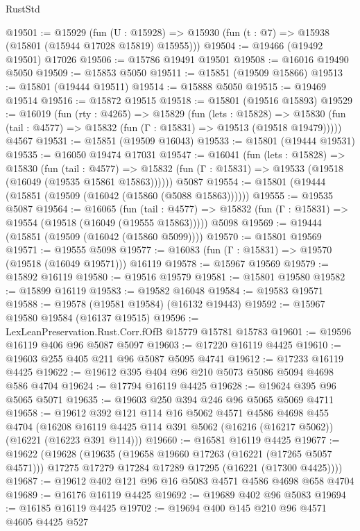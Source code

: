 \begin{lexlean}{RustStd}
\begin{coremodule}
@19501 := @15929
    (fun (U : @15928) => @15930 (fun (t : @7) => @15938 (@15801 (@15944 @17028 @15819) @15955)))
@19504 := @19466 (@19492 @19501) @17026
@19506 := @15786 @19491 @19501
@19508 := @16016 @19490 @5050
@19509 := @15853 @5050
@19511 := @15851 (@19509 @15866)
@19513 := @15801 (@19444 @19511)
@19514 := @15888 @5050
@19515 := @19469 @19514
@19516 := @15872 @19515
@19518 := @15801 (@19516 @15893)
@19529 := @16019
    (fun (rty : @4265) =>
    @15829
      (fun (lets : @15828) =>
      @15830 (fun (tail : @4577) => @15832 (fun (Γ : @15831) => @19513 (@19518 @19479)))))
    @4567
@19531 := @15851 (@19509 @16043)
@19533 := @15801 (@19444 @19531)
@19535 := @16050 @19474 @17031
@19547 := @16041
    (fun (lets : @15828) =>
    @15830
      (fun (tail : @4577) =>
      @15832 (fun (Γ : @15831) => @19533 (@19518 (@16049 (@19535 @15861 @15863))))))
    @5087
@19554 := @15801 (@19444 (@15851 (@19509 (@16042 (@15860 (@5088 @15863))))))
@19555 := @19535 @5087
@19564 := @16065
    (fun (tail : @4577) => @15832 (fun (Γ : @15831) => @19554 (@19518 (@16049 (@19555 @15863)))))
    @5098
@19569 := @19444 (@15851 (@19509 (@16042 (@15860 @5099))))
@19570 := @15801 @19569
@19571 := @19555 @5098
@19577 := @16083 (fun (Γ : @15831) => @19570 (@19518 (@16049 @19571))) @16119
@19578 := @15967 @19569
@19579 := @15892 @16119
@19580 := @19516 @19579
@19581 := @15801 @19580
@19582 := @15899 @16119
@19583 := @19582 @16048
@19584 := @19583 @19571
@19588 := @19578 (@19581 @19584) (@16132 @19443)
@19592 := @15967 @19580 @19584 (@16137 @19515)
@19596 := LexLeanPreservation.Rust.Corr.fOfB @15779 @15781 @15783
@19601 := @19596 @16119 @406 @96 @5087 @5097
@19603 := @17220 @16119 @4425
@19610 := @19603 @255 @405 @211 @96 @5087 @5095 @4741
@19612 := @17233 @16119 @4425
@19622 := @19612 @395 @404 @96 @210 @5073 @5086 @5094 @4698 @586 @4704
@19624 := @17794 @16119 @4425
@19628 := @19624 @395 @96 @5065 @5071
@19635 := @19603 @250 @394 @246 @96 @5065 @5069 @4711
@19658 := @19612
    @392
    @121
    @114
    @16
    @5062
    @4571
    @4586
    @4698
    @455
    @4704
    (@16208 @16119 @4425 @114 @391 @5062 (@16216 (@16217 @5062)) (@16221 (@16223 @391 @114)))
@19660 := @16581 @16119 @4425
@19677 := @19622
    (@19628
      (@19635
        (@19658 @19660 @17263 (@16221 (@17265 @5057 @4571)))
        @17275
        @17279
        @17284
        @17289
        @17295
        (@16221 (@17300 @4425))))
@19687 := @19612 @402 @121 @96 @16 @5083 @4571 @4586 @4698 @658 @4704
@19689 := @16176 @16119 @4425
@19692 := @19689 @402 @96 @5083
@19694 := @16185 @16119 @4425
@19702 := @19694 @400 @145 @210 @96 @4571 @4605 @4425 @527

\end{coremodule}
\end{lexlean}
